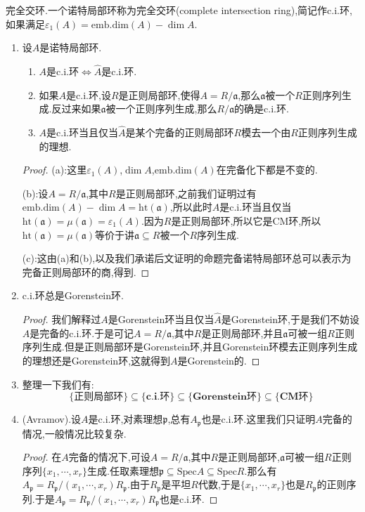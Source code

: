 完全交环.一个诺特局部环称为完全交环(complete intersection ring),简记作c.i.环,如果满足$\varepsilon_1(A)=\mathrm{emb.dim}(A)-\dim A$.
\begin{enumerate}
	\item 设$A$是诺特局部环.
	\begin{enumerate}
		\item $A$是c.i.环$\Leftrightarrow\widehat{A}$是c.i.环.
		\item 如果$A$是c.i.环,设$R$是正则局部环,使得$A=R/\mathfrak{a}$,那么$\mathfrak{a}$被一个$R$正则序列生成.反过来如果$\mathfrak{a}$被一个正则序列生成,那么$R/\mathfrak{a}$的确是c.i.环.
		\item $A$是c.i.环当且仅当$\widehat{A}$是某个完备的正则局部环$R$模去一个由$R$正则序列生成的理想.
	\end{enumerate}
    \begin{proof}
    	
    	(a):这里$\varepsilon_1(A)$,$\dim A$,$\mathrm{emb.dim}(A)$在完备化下都是不变的.
    	
    	\qquad
    	
    	(b):设$A=R/\mathfrak{a}$,其中$R$是正则局部环,之前我们证明过有$\mathrm{emb.dim}(A)-\dim A=\mathrm{ht}(\mathfrak{a})$,所以此时$A$是c.i.环当且仅当$\mathrm{ht}(\mathfrak{a})=\mu(\mathfrak{a})=\varepsilon_1(A)$.因为$R$是正则局部环,所以它是CM环,所以$\mathrm{ht}(\mathfrak{a})=\mu(\mathfrak{a})$等价于讲$\mathfrak{a}\subseteq R$被一个$R$序列生成.
    	
    	\qquad
    	
    	(c):这由(a)和(b),以及我们承诺后文证明的命题完备诺特局部环总可以表示为完备正则局部环的商,得到.
    \end{proof}
    \item c.i.环总是Gorenstein环.
    \begin{proof}
    	
    	我们解释过$A$是Gorenstein环当且仅当$\widehat{A}$是Gorenstein环,于是我们不妨设$A$是完备的c.i.环.于是可记$A=R/\mathfrak{a}$,其中$R$是正则局部环,并且$\mathfrak{a}$可被一组$R$正则序列生成.但是正则局部环是Gorenstein环,并且Gorenstein环模去正则序列生成的理想还是Gorenstein环,这就得到$A$是Gorenstein的.
    \end{proof}
    \item 整理一下我们有:
    $$\{\textbf{正则局部环}\}\subseteq\{\textbf{c.i.环}\}\subseteq\{\textbf{Gorenstein环}\}\subseteq\{\textbf{CM环}\}$$
    \item (Avramov).设$A$是c.i.环,对素理想$\mathfrak{p}$,总有$A_{\mathfrak{p}}$也是c.i.环.这里我们只证明$A$完备的情况,一般情况比较复杂.
    \begin{proof}
    	
    	在$A$完备的情况下,可设$A=R/\mathfrak{a}$,其中$R$是正则局部环,$\mathfrak{a}$可被一组$R$正则序列$\{x_1,\cdots,x_r\}$生成.任取素理想$\mathfrak{p}\subseteq\mathrm{Spec}A\subseteq\mathrm{Spec}R$.那么有$A_{\mathfrak{p}}=R_{\mathfrak{p}}/(x_1,\cdots,x_r)R_{\mathfrak{p}}$.由于$R_{\mathfrak{p}}$是平坦$R$代数,于是$\{x_1,\cdots,x_r\}$也是$R_{\mathfrak{p}}$的正则序列.于是$A_{\mathfrak{p}}=R_{\mathfrak{p}}/(x_1,\cdots,x_r)R_{\mathfrak{p}}$也是c.i.环.
    \end{proof}
\end{enumerate}
\newpage
